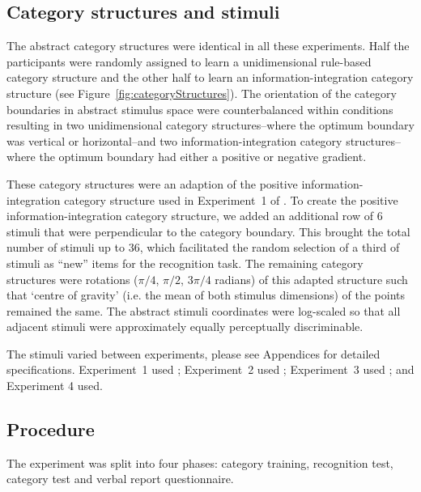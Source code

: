 \documentclass[12pt]{article}
\begin{document}
\subsection{Category structures and stimuli}
The abstract category structures were identical in all these experiments. Half the participants were randomly assigned to learn a unidimensional rule-based category structure and the other half to learn an information-integration category structure (see Figure~\ref{fig:categoryStructures}).  The orientation of the category boundaries in abstract stimulus space were counterbalanced within conditions resulting in two unidimensional category structures--where the optimum boundary was vertical or horizontal--and two information-integration category structures--where the optimum boundary had either a positive or negative gradient.

These category structures were an adaption of the positive information-integration category structure used in Experiment~1 of . To create the positive information-integration category structure, we added an additional row of 6 stimuli that were perpendicular to the category boundary. This brought the total number of stimuli up to 36, which facilitated the random selection of a third of stimuli as ``new'' items for the recognition task. The remaining category structures were rotations ($\pi/4$, $\pi/2$, $3\pi/4$ radians) of this adapted structure such that `centre of gravity' (i.e. the mean of both stimulus dimensions) of the points remained the same. The abstract stimuli coordinates were log-scaled so that all adjacent stimuli were approximately equally perceptually discriminable.

The stimuli varied between experiments, please see Appendices for detailed specifications. Experiment~1 used ; Experiment~2 used ; Experiment~3 used ; and Experiment 4 used. 

\subsection{Procedure}
The experiment was split into four phases: category training, recognition test, category test and verbal report questionnaire.
\end{document}
